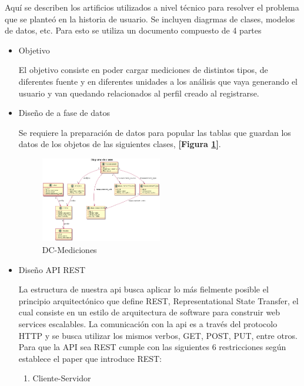 Aquí se describen los artificios utilizados a nivel técnico para resolver el problema que se planteó en la historia de usuario. Se incluyen diagrmas de clases, modelos de datos, etc. Para esto se utiliza un documento compuesto de 4 partes
\begin{itemize}
\item Objetivo

El objetivo consiste en poder cargar mediciones de distintos tipos, de diferentes fuente y en diferentes unidades a los análisis que vaya generando el usuario y van quedando relacionados al perfil creado al registrarse.

\item Diseño de a fase de datos

Se requiere la preparación de datos para popular las tablas que guardan los datos de los objetos de las siguientes clases, \textbf{[Figura \ref{clases-doc-prog}]}.

    \begin{figure}[h]
        \centering
        \includegraphics[width=0.5\textwidth]{img/dc_mediciones}
        \caption{DC-Mediciones}
		\label{clases-doc-prog}
    \end{figure}

\newpage

\item Diseño API REST


La estructura de nuestra api busca aplicar lo más fielmente posible el principio arquitectónico que define  REST, Representational State Transfer, el cual consiste en un estilo de arquitectura de software para construir web services escalables. La comunicación con la api es a través del protocolo HTTP y se busca utilizar los mismos verbos, GET, POST, PUT, entre otros. Para que la API sea REST cumple con las siguientes 6 restricciones según establece el paper que introduce REST:
\begin{enumerate}
	\item Cliente-Servidor
    

\end{enumerate}
\end{itemize}
